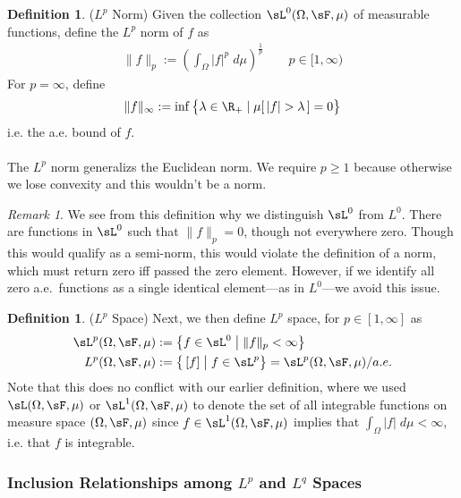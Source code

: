 \documentclass[12pt]{article}
\theoremstyle{plain}
\theoremstyle{definition}
\newtheorem{defn}[thm]{Definition}
\theoremstyle{remark}
\newtheorem*{rmk}{Remark}
\begin{document}
\begin{defn}($L^p$ Norm)
Given the collection $\sL^0(\Omega,\sF,\mu)$ of measurable functions,
define the $L^p$ norm of $f$ as
\begin{align*}
  \lVert f\rVert_p := \left(\int_\Omega |f|^p\;d\mu\right)^{\frac{1}{p}}
  \qquad p \in [1,\infty)
\end{align*}
For $p=\infty$, define
\begin{align*}
  \lVert f\rVert_\infty := \inf\big\{\lambda \in\R_+ \;|\; \mu[\,|f|>\lambda\,]=0\big\}
\end{align*}
i.e. the a.e. bound of $f$.
\\
\\
The $L^p$ norm generalizs the Euclidean norm.
We require $p\geq 1$ because otherwise we lose convexity and this
wouldn't be a norm.
\end{defn}
\begin{rmk}
We see from this definition why we distinguish $\sL^0$ from $L^0$.
There are functions in $\sL^0$ such that $\lVert f\rVert_p = 0$, though
not everywhere zero.
Though this would qualify as a semi-norm, this would violate the
definition of a norm, which must return zero iff passed the zero
element.
However, if we identify all zero a.e.\ functions as a single identical
element---as in $L^0$---we avoid this issue.
\end{rmk}

\begin{defn}($L^p$ Space)
Next, we then define $L^p$ space, for $p\in[1,\infty]$ as
\begin{align*}
    \sL^p(\Omega,\sF,\mu)
    &:=\left\{ f\in\sL^0 \;\big|\; \lVert  f\rVert_p < \infty\right\} \\
    L^p(\Omega,\sF,\mu)
    &:=
    \big\{ \, [f] \; \big| \; f \in\sL^p\big\}
    = \sL^p(\Omega,\sF,\mu)/a.e.
\end{align*}
Note that this does no conflict with our earlier definition, where we
used $\sL(\Omega,\sF,\mu)$ or $\sL^1(\Omega,\sF,\mu)$ to denote the set
of all integrable functions on measure space $(\Omega,\sF,\mu)$ since
$f\in \sL^1(\Omega,\sF,\mu)$ implies that
$\int_\Omega |f| \; d\mu <\infty$, i.e. that $f$ is integrable.
\end{defn}

\subsubsection{Inclusion Relationships among $L^p$ and $L^q$ Spaces}
\end{document}
